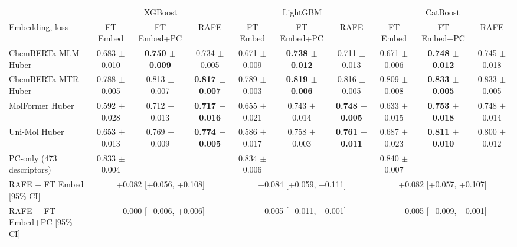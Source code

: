 \begin{tabular}{@{}lccccccccc@{}}
\toprule
 & \multicolumn{3}{c}{XGBoost} & \multicolumn{3}{c}{LightGBM} & \multicolumn{3}{c}{CatBoost} \\
\cmidrule(lr){2-4} \cmidrule(lr){5-7} \cmidrule(lr){8-10}
Embedding, loss & FT Embed & FT Embed+PC & RAFE & FT Embed & FT Embed+PC & RAFE & FT Embed & FT Embed+PC & RAFE \\
\midrule
ChemBERTa-MLM Huber & 0.683 $\pm$ 0.010 & \textbf{0.750 $\pm$ 0.009} & 0.734 $\pm$ 0.005 & 0.671 $\pm$ 0.009 & \textbf{0.738 $\pm$ 0.012} & 0.711 $\pm$ 0.013 & 0.671 $\pm$ 0.006 & \textbf{0.748 $\pm$ 0.012} & 0.745 $\pm$ 0.018 \\
ChemBERTa-MTR Huber & 0.788 $\pm$ 0.005 & 0.813 $\pm$ 0.007 & \textbf{0.817 $\pm$ 0.007} & 0.789 $\pm$ 0.003 & \textbf{0.819 $\pm$ 0.006} & 0.816 $\pm$ 0.005 & 0.809 $\pm$ 0.008 & \textbf{0.833 $\pm$ 0.005} & 0.833 $\pm$ 0.005 \\
MolFormer Huber & 0.592 $\pm$ 0.028 & 0.712 $\pm$ 0.013 & \textbf{0.717 $\pm$ 0.016} & 0.655 $\pm$ 0.021 & 0.743 $\pm$ 0.014 & \textbf{0.748 $\pm$ 0.005} & 0.633 $\pm$ 0.015 & \textbf{0.753 $\pm$ 0.018} & 0.748 $\pm$ 0.014 \\
Uni-Mol Huber & 0.653 $\pm$ 0.013 & 0.769 $\pm$ 0.009 & \textbf{0.774 $\pm$ 0.005} & 0.586 $\pm$ 0.017 & 0.758 $\pm$ 0.003 & \textbf{0.761 $\pm$ 0.011} & 0.687 $\pm$ 0.023 & \textbf{0.811 $\pm$ 0.010} & 0.800 $\pm$ 0.012 \\
\midrule
PC-only (473 descriptors) & 0.833 $\pm$ 0.004 &  &  & 0.834 $\pm$ 0.006 &  &  & 0.840 $\pm$ 0.007 &  &  \\
RAFE $-$ FT Embed [95\% CI] & \multicolumn{3}{c}{+0.082 [+0.056, +0.108]} & \multicolumn{3}{c}{+0.084 [+0.059, +0.111]} & \multicolumn{3}{c}{+0.082 [+0.057, +0.107]} \\
RAFE $-$ FT Embed+PC [95\% CI] & \multicolumn{3}{c}{$-$0.000 [$-$0.006, +0.006]} & \multicolumn{3}{c}{$-$0.005 [$-$0.011, +0.001]} & \multicolumn{3}{c}{$-$0.005 [$-$0.009, $-$0.001]} \\
\bottomrule
\end{tabular}
